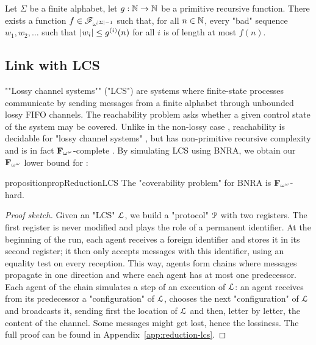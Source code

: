 \begin{theorem}
	\label{thm:lengthfcttheorem}
	Let $\Sigma$ be a finite alphabet, let $g : \mathbb{N} \to \mathbb{N}$ be a primitive recursive function.
	There exists a function $f \in \mathscr{F}_{\omega^{|\Sigma| - 1}}$ such that, for all $n \in \mathbb{N}$, every "bad" sequence $w_1, w_2, \ldots$ such that $|w_i| \leq g^{(i)}(n)$ for all $i$ is of length at most $f(n)$. 
\end{theorem}



\subsection{Link with LCS}

""Lossy channel systems"" ("LCS") are systems where finite-state processes communicate by sending messages from a finite alphabet through unbounded lossy FIFO channels. The reachability problem asks whether a given control state of the system may be covered. Unlike in the non-lossy case \cite{BZ83}, reachability is decidable for "lossy channel systems" \cite{AbdullaJ1996verif}, but has non-primitive recursive complexity \cite{Schnoebelen2002verifying} and is in fact $\mathbf{F}_{\omega^{\omega}}$-complete \cite{ChambartS08ordinal}. 
By simulating LCS using BNRA, we obtain our $\mathbf{F}_{\omega^{\omega}}$ lower bound for \COVER:

\begin{restatable}{proposition}{propReductionLCS}
	\label{prop:reduction-LCS}
	The "coverability problem" for BNRA is $\mathbf{F}_{\omega^\omega}$-hard.
\end{restatable}
\begin{proof}[Proof sketch]
Given an "LCS" $\mathcal{L}$, we build a "protocol" $\mathcal{P}$ with two registers. The first register is never modified and plays the role of a permanent identifier.
At the beginning of the run, each agent receives a foreign identifier and stores it in its second register; it then only accepts messages with this identifier, using an equality test on every reception.
 This way, agents form chains where messages propagate in one direction and where each agent has at most one predecessor. 
 Each agent of the chain simulates a step of an execution of $\mathcal{L}$: an agent receives from its predecessor a "configuration" of $\mathcal{L}$, chooses the next "configuration" of $\mathcal{L}$ and broadcasts it, sending first the location of $\mathcal{L}$ and then, letter by letter, the content of the channel. 
 Some messages might get lost, hence the lossiness. The full proof can be found in Appendix~\ref{app:reduction-lcs}.
\end{proof}


